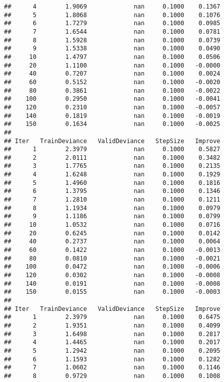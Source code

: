 \documentclass[]{article}
\begin{document}
\begin{verbatim}
##      4        1.9069             nan     0.1000    0.1367
##      5        1.8068             nan     0.1000    0.1076
##      6        1.7279             nan     0.1000    0.0985
##      7        1.6544             nan     0.1000    0.0781
##      8        1.5928             nan     0.1000    0.0739
##      9        1.5338             nan     0.1000    0.0490
##     10        1.4797             nan     0.1000    0.0506
##     20        1.1100             nan     0.1000   -0.0000
##     40        0.7207             nan     0.1000    0.0024
##     60        0.5152             nan     0.1000   -0.0020
##     80        0.3861             nan     0.1000   -0.0022
##    100        0.2950             nan     0.1000   -0.0041
##    120        0.2310             nan     0.1000   -0.0057
##    140        0.1819             nan     0.1000   -0.0019
##    150        0.1634             nan     0.1000   -0.0025
## 
## Iter   TrainDeviance   ValidDeviance   StepSize   Improve
##      1        2.3979             nan     0.1000    0.5827
##      2        2.0111             nan     0.1000    0.3482
##      3        1.7765             nan     0.1000    0.2135
##      4        1.6248             nan     0.1000    0.1929
##      5        1.4960             nan     0.1000    0.1816
##      6        1.3795             nan     0.1000    0.1346
##      7        1.2810             nan     0.1000    0.1211
##      8        1.1934             nan     0.1000    0.0979
##      9        1.1186             nan     0.1000    0.0799
##     10        1.0532             nan     0.1000    0.0716
##     20        0.6245             nan     0.1000    0.0142
##     40        0.2737             nan     0.1000    0.0064
##     60        0.1422             nan     0.1000   -0.0013
##     80        0.0810             nan     0.1000   -0.0021
##    100        0.0472             nan     0.1000   -0.0006
##    120        0.0302             nan     0.1000   -0.0008
##    140        0.0191             nan     0.1000   -0.0008
##    150        0.0155             nan     0.1000   -0.0003
## 
## Iter   TrainDeviance   ValidDeviance   StepSize   Improve
##      1        2.3979             nan     0.1000    0.6475
##      2        1.9351             nan     0.1000    0.4099
##      3        1.6498             nan     0.1000    0.2817
##      4        1.4465             nan     0.1000    0.2017
##      5        1.2942             nan     0.1000    0.2095
##      6        1.1593             nan     0.1000    0.1282
##      7        1.0602             nan     0.1000    0.1146
##      8        0.9729             nan     0.1000    0.1008

\end{verbatim}
\end{document}
